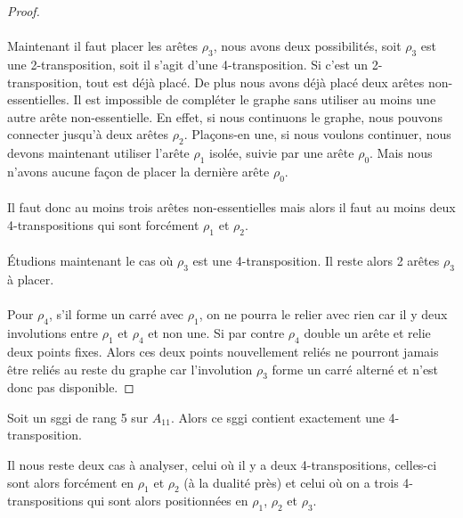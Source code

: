 \begin{proof}
  \paragraph{}
  Maintenant il faut placer les arêtes $\rho_3$, nous avons deux possibilités, soit $\rho_3$ est une 2-transposition, soit il s'agit d'une 4-transposition. Si c'est un 2-transposition, tout est déjà placé. De plus nous avons déjà placé deux arêtes non-essentielles. Il est impossible de compléter le graphe sans utiliser au moins une autre arête non-essentielle. En effet, si nous continuons le graphe, nous pouvons connecter jusqu'à deux arêtes $\rho_2$. Plaçons-en une, si nous voulons continuer, nous devons maintenant utiliser l'arête $\rho_1$ isolée, suivie par une arête $\rho_0$. Mais nous n'avons aucune façon de placer la dernière arête $\rho_0$.

  \paragraph{}
  Il faut donc au moins trois arêtes non-essentielles mais alors il faut au moins deux 4-transpositions qui sont forcément $\rho_1$ et $\rho_2$.

  \paragraph{}
  Étudions maintenant le cas où $\rho_3$ est une 4-transposition. Il reste alors 2 arêtes $\rho_3$ à placer.

  \paragraph{}
  Pour $\rho_4$, s'il forme un carré avec $\rho_1$, on ne pourra le relier avec rien car il y deux involutions entre $\rho_1$ et $\rho_4$ et non une. Si par contre $\rho_4$ double un arête et relie deux points fixes. Alors ces deux points nouvellement reliés ne pourront jamais être reliés au reste du graphe car l'involution $\rho_3$ forme un carré alterné et n'est donc pas disponible.
\end{proof}

\begin{theorem}
  Soit un sggi de rang 5 sur $A_{11}$. Alors ce sggi contient exactement une 4-transposition.
\end{theorem}

Il nous reste deux cas à analyser, celui où il y a deux 4-transpositions, celles-ci sont alors forcément en $\rho_1$ et $\rho_2$ (à la dualité près) et celui où on a trois 4-transpositions qui sont alors positionnées en $\rho_1$, $\rho_2$ et $\rho_3$.

